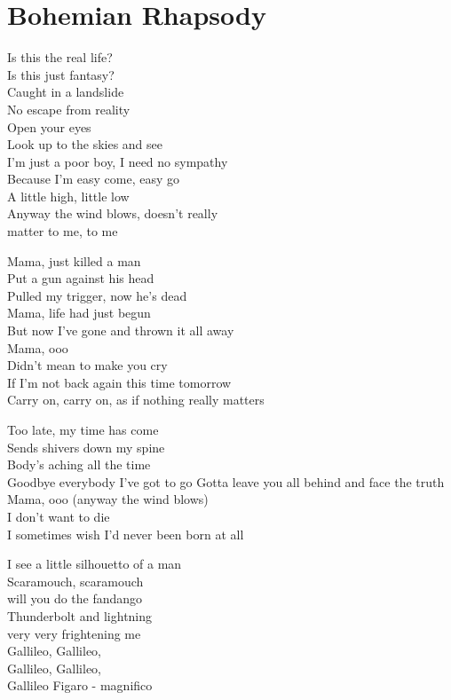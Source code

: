\section{Bohemian Rhapsody}
Is this the real life?\\
Is this just fantasy?\\
Caught in a landslide\\
No escape from reality\\
Open your eyes\\
Look up to the skies and see\\
I'm just a poor boy, I need no sympathy\\
Because I'm easy come, easy go\\
A little high, little low\\
Anyway the wind blows, doesn't really\\
matter to me, to me

Mama, just killed a man\\
Put a gun against his head\\
Pulled my trigger, now he's dead\\
Mama, life had just begun\\
But now I've gone and thrown it all away\\
Mama, ooo\\
Didn't mean to make you cry\\
If I'm not back again this time tomorrow\\
Carry on, carry on, as if nothing really
matters

Too late, my time has come\\
Sends shivers down my spine\\
Body's aching all the time\\
Goodbye everybody I've got to go
Gotta leave you all behind and face the
truth\\
Mama, ooo (anyway the wind blows)\\
I don't want to die\\
I sometimes wish I'd never been born at
all

I see a little silhouetto of a man\\
Scaramouch, scaramouch\\
will you do the fandango\\
Thunderbolt and lightning\\
very very frightening me\\
Gallileo, Gallileo,\\
Gallileo, Gallileo,\\
Gallileo Figaro - magnifico

